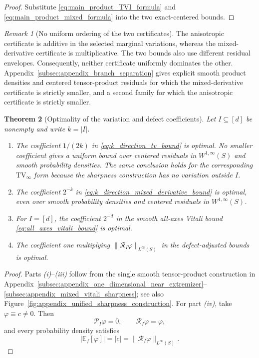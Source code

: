 \documentclass[11pt,letterpaper]{article}
\newtheorem{theorem}{Theorem}[section]
\theoremstyle{definition}
\theoremstyle{remark}
\newtheorem{remark}[theorem]{Remark}
\newcommand{\TV}{\mathrm{TV}}
\begin{document}
\begin{proof}
Substitute \eqref{eq:main_product_TVI_formula} and
\eqref{eq:main_product_mixed_formula} into the two exact-centered bounds.
\end{proof}

\begin{remark}[No uniform ordering of the two certificates]
\label{rem:main_no_uniform_ordering_certificates}
The anisotropic certificate is additive in the selected marginal variations,
whereas the mixed-derivative certificate is multiplicative. The two bounds
also use different residual envelopes. Consequently, neither certificate
uniformly dominates the other. Appendix~\ref{subsec:appendix_branch_separation}
gives explicit smooth product densities and centered tensor-product residuals
for which the mixed-derivative certificate is strictly smaller, and a second
family for which the anisotropic certificate is strictly smaller.
\end{remark}

\begin{theorem}[Optimality of the variation and defect coefficients]
\label{thm:main_sharp_constants}
Let $I\subseteq[d]$ be nonempty and write $k=|I|$.

\begin{enumerate}
\item[\emph{(i)}] The coefficient $1/(2k)$ in
\eqref{eq:k_direction_tv_bound} is optimal. No smaller coefficient gives a
uniform bound over centered residuals in $W^{1,\infty}(S)$ and smooth
probability densities. The same conclusion holds for the corresponding
$\TV_\infty$ form because the sharpness construction has no variation outside
$I$.

\item[\emph{(ii)}] The coefficient $2^{-k}$ in
\eqref{eq:k_direction_mixed_derivative_bound} is optimal, even over smooth
probability densities and centered residuals in $W^{1,\infty}(S)$.

\item[\emph{(iii)}] For $I=[d]$, the coefficient $2^{-d}$ in the smooth
all-axes Vitali bound \eqref{eq:all_axes_vitali_bound} is optimal.

\item[\emph{(iv)}] The coefficient one multiplying
$\|\mathcal R_I\varphi\|_{L^\infty(S)}$ in the defect-adjusted bounds is
optimal.
\end{enumerate}
\end{theorem}

\begin{proof}
Parts \emph{(i)}--\emph{(iii)} follow from the single smooth tensor-product
construction in
Appendix~\ref{subsec:appendix_one_dimensional_near_extremizer}--\ref{subsec:appendix_mixed_vitali_sharpness}; see also
Figure~\ref{fig:appendix_unified_sharpness_construction}. For part \emph{(iv)},
take $\varphi\equiv c\neq0$. Then
$$
\mathcal P_I\varphi=0,
\qquad
\mathcal R_I\varphi=\varphi,
$$
and every probability density satisfies
$$
|\mathbb E_f[\varphi]|
=|c|
=\|\mathcal R_I\varphi\|_{L^\infty(S)}.
$$
\end{proof}
\end{document}
